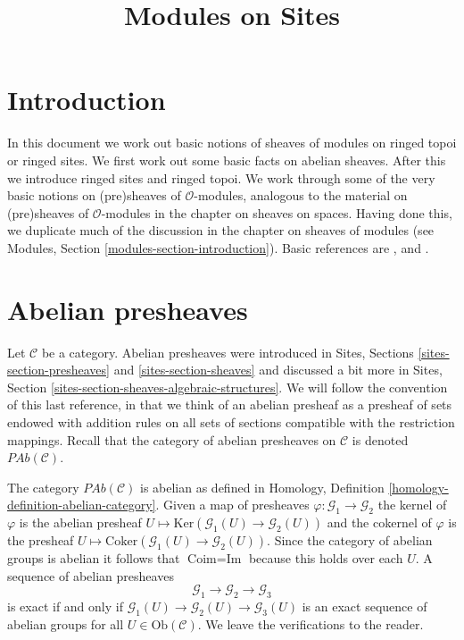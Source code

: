 

%


\title{Modules on Sites}


\maketitle

\label{section-phantom}

\tableofcontents

\section{Introduction}
\label{section-introduction}

\noindent
In this document we work out basic notions of sheaves of modules on
ringed topoi or ringed sites. We first work out some basic facts on
abelian sheaves. After this we introduce ringed sites and ringed topoi.
We work through some of the very basic notions on (pre)sheaves of
$\mathcal{O}$-modules, analogous to the material on (pre)sheaves of
$\mathcal{O}$-modules in the chapter on sheaves on spaces.
Having done this, we duplicate much of the discussion in the chapter on
sheaves of modules (see Modules, Section \ref{modules-section-introduction}).
Basic references are \cite{FAC}, \cite{EGA} and \cite{SGA4}.






\section{Abelian presheaves}
\label{section-abelian-pre-sheaves}

\noindent
Let $\mathcal{C}$ be a category.
Abelian presheaves were introduced in
Sites, Sections \ref{sites-section-presheaves}
and \ref{sites-section-sheaves} and discussed a bit more
in Sites, Section \ref{sites-section-sheaves-algebraic-structures}.
We will follow the convention of this last reference, in that we think
of an abelian presheaf as a presheaf of sets endowed with addition rules
on all sets of sections compatible with the restriction mappings.
Recall that the category of abelian presheaves on $\mathcal{C}$
is denoted $\textit{PAb}(\mathcal{C})$.

\medskip\noindent
The category $\textit{PAb}(\mathcal{C})$ is abelian as defined in
Homology, Definition \ref{homology-definition-abelian-category}.
Given a map of presheaves $\varphi : \mathcal{G}_1 \to \mathcal{G}_2$
the kernel of $\varphi$ is the abelian presheaf
$U \mapsto \text{Ker}(\mathcal{G}_1(U) \to \mathcal{G}_2(U))$ and
the cokernel of $\varphi$ is the presheaf
$U \mapsto \text{Coker}(\mathcal{G}_1(U) \to \mathcal{G}_2(U))$.
Since the category of abelian groups is abelian it follows that
$\text{Coim} = \text{Im}$ because this holds over each $U$.
A sequence of abelian presheaves
$$
\mathcal{G}_1 \longrightarrow
\mathcal{G}_2 \longrightarrow
\mathcal{G}_3
$$
is exact if and only if
$\mathcal{G}_1(U) \to \mathcal{G}_2(U) \to \mathcal{G}_3(U)$
is an exact sequence of abelian groups for all $U \in \text{Ob}(\mathcal{C})$.
We leave the verifications to the reader.

